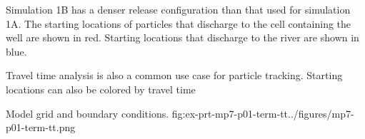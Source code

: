 Simulation 1B has a denser release configuration than that used for simulation 1A. The starting locations of particles that discharge to the cell containing the well are shown in red. Starting locations that discharge to the river are shown in blue.

Travel time analysis is also a common use case for particle tracking. Starting locations can also be colored by travel time

\begin{StandardFigure}{
    Model grid and boundary conditions.
    }{fig:ex-prt-mp7-p01-term-tt}{../figures/mp7-p01-term-tt.png}
\end{StandardFigure}